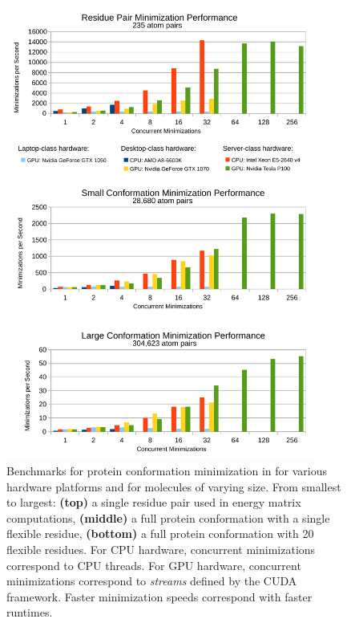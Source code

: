 \begin{figure}\label{fig:gpu}
\center
\includegraphics[width=4in]{figures/gpu.pdf}
\caption{Benchmarks for protein conformation minimization in  for various hardware platforms and for molecules of varying size. From smallest to largest: {\bf (top)} a single residue pair used in energy matrix computations, {\bf (middle)} a full protein conformation with a single flexible residue, {\bf (bottom)} a full protein conformation with 20 flexible residues. For CPU hardware, concurrent minimizations correspond to CPU threads. For GPU hardware, concurrent minimizations correspond to {\it streams} defined by the CUDA framework. Faster minimization speeds correspond with faster \osprey runtimes.}
\end{figure}

